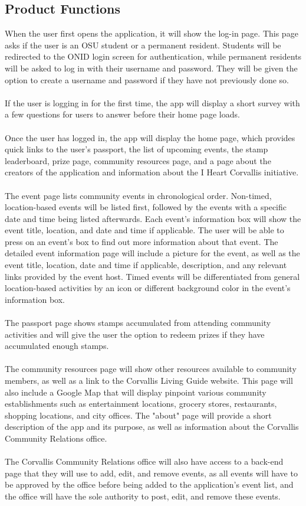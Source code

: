 \documentclass[draftclsnofoot, onecolumn, 10pt, compsoc]{IEEEtran}
\begin{document}
		\subsection{Product Functions}
			When the user first opens the application, it will show the log-in page. This page asks if the user is an OSU student or a permanent resident. Students will be redirected to the ONID login screen for authentication, while permanent residents will be asked to log in with their username and password. They will be given the option to create a username and password if they have not previously done so. \\ \\
			If the user is logging in for the first time, the app will display a short survey with a few questions for users to answer before their home page loads. \\ \\
			Once the user has logged in, the app will display the home page, which provides quick links to the user's passport, the list of upcoming events, the stamp leaderboard, prize page, community resources page, and a page about the creators of the application and information about the I Heart Corvallis initiative. \\ \\
			The event page lists community events in chronological order. Non-timed, location-based events will be listed first, followed by the events with a specific date and time being listed afterwards. Each event's information box will show the event title, location, and date and time if applicable. The user will be able to press on an event's box to find out more information about that event. The detailed event information page will include a picture for the event, as well as the event title, location, date and time if applicable, description, and any relevant links provided by the event host. Timed events will be differentiated from general location-based activities by an icon or different background color in the event's information box. \\ \\
			The passport page shows stamps accumulated from attending community activities and will give the user the option to redeem prizes if they have accumulated enough stamps. \\ \\
			The community resources page will show other resources available to community members, as well as a link to the Corvallis Living Guide website. This page will also include a Google Map that will display pinpoint various community establishments such as entertainment locations, grocery stores, restaurants, shopping locations, and city offices. The "about" page will provide a short description of the app and its purpose, as well as information about the Corvallis Community Relations office. \\ \\
			The Corvallis Community Relations office will also have access to a back-end page that they will use to add, edit, and remove events, as all events will have to be approved by the office before being added to the application's event list, and the office will have the sole authority to post, edit, and remove these events.
		
\end{document}
